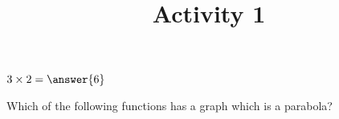 \documentclass{ximera}
\title{Activity 1 }
\begin{document}
\begin{abstract}
\end{abstract}
\maketitle

\begin{question}  
$3\times 2 = \answer{6}$  
\end{question}

\begin{question}  
Which of the following functions has a graph which is a parabola?  
\begin{multipleChoice}  
\end{multipleChoice}  
\end{question}
\end{document}
